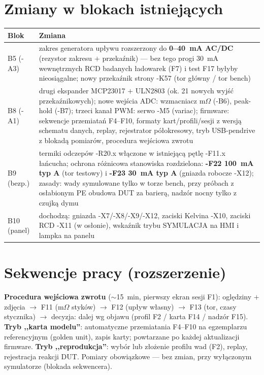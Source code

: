 \documentclass[11pt,a4paper]{article}
\newcommand{\ohm}{$\Omega$}
\begin{document}
\section{Zmiany w blokach istniejących}
\begin{longtable}{@{}p{}p{}@{}}
\toprule
\textbf{Blok} & \textbf{Zmiana}\\
\midrule
B5 (-A3) & zakres generatora upływu rozszerzony do \textbf{0--40~mA AC/DC} (rezystor zakresu $+$
przekaźnik) --- bez tego progi 30~mA wewnętrznych RCD badanych ładowarek (F7) i test F17 byłyby
nieosiągalne; nowy przekaźnik strony -K57 (tor główny / tor bench)\\
B8 (-A1) & drugi ekspander MCP23017 $+$ ULN2803 (ok. 21 nowych wyjść przekaźnikowych); nowe
wejścia ADC: wzmacniacz m\ohm{} (-B6), peak-hold (-B7); trzeci kanał PWM: serwo -M5 (variac);
firmware: sekwencje przemiatań F4--F10, formaty kart/profili/sesji z wersją schematu danych,
replay, rejestrator półokresowy, tryb USB-pendrive z blokadą pomiarów, procedura wejściowa
zwrotu\\
B9 (bezp.) & termiki odczepów -R20.x włączone w istniejącą pętlę -F11.x łańcucha; ochrona
różnicowa stanowiska rozdzielona: \textbf{-F22 100~mA typ A} (tor testowy) i \textbf{-F23 30~mA
typ A} (gniazda robocze -X12); zasady: wady symulowane tylko w torze bench, przy próbach
z osłabionym PE obudowa DUT za barierą, nadzór nocny tylko z czujką dymu\\
B10 (panel) & dochodzą: gniazda -X7/-X8/-X9/-X12, zaciski Kelvina -X10, zaciski RCD -X11
(w osłonie), wskaźnik trybu SYMULACJA na HMI i lampka na panelu\\
\bottomrule
\end{longtable}

\section{Sekwencje pracy (rozszerzenie)}
\textbf{Procedura wejściowa zwrotu} ($\sim$15~min, pierwszy ekran sesji F1): oględziny $+$ zdjęcia
$\to$ F11 (m\ohm{} styków) $\to$ F12 (upływ własny) $\to$ F13 (tor, czasy stycznika) $\to$ decyzja:
dalej wg objawu (profil F2 / karta F14 / nadzór F15). \textbf{Tryb ,,karta modelu''}: automatyczne
przemiatania F4--F10 na egzemplarzu referencyjnym (golden unit), zapis karty; powtarzane po każdej
aktualizacji firmware. \textbf{Tryb ,,reprodukcja''}: wybór lub złożenie profilu wad (F2), replay,
rejestracja reakcji DUT. Pomiary obowiązkowe --- bez zmian, przy wyłączonym symulatorze
(blokada sekwencera).
\end{document}
